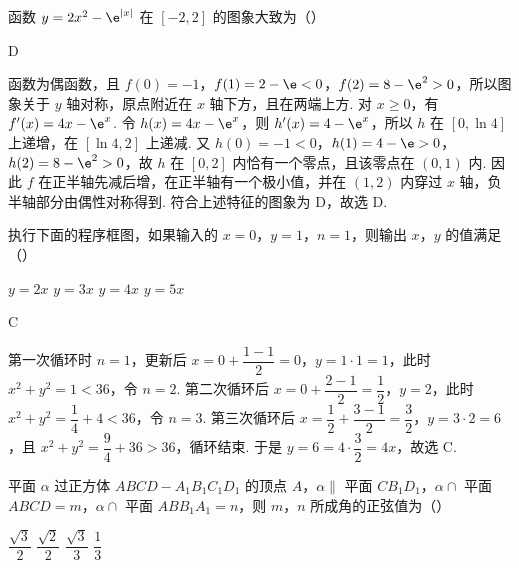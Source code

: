 \begin{problem}
函数 \(y=2x^2-\e^{|x|}\) 在 \([-2,2]\) 的图象大致为（\quad）

    {}
    {}
    {}
\end{problem}

\begin{answer}
D
\end{answer}

\begin{solution}
函数为偶函数，且 \(f(0)=-1\)，\(f(1)=2-\e<0\)，\(f(2)=8-\e^2>0\)，所以图象关于 \(y\) 轴对称，原点附近在 \(x\) 轴下方，且在两端上方. 对 \(x\ge0\)，有 \(f'(x)=4x-\e^x\). 令 \(h(x)=4x-\e^x\)，则 \(h'(x)=4-\e^x\)，所以 \(h\) 在 \([0,\ln4]\) 上递增，在 \([\ln4,2]\) 上递减. 又 \(h(0)=-1<0\)，\(h(1)=4-\e>0\)，\(h(2)=8-\e^2>0\)，故 \(h\) 在 \([0,2]\) 内恰有一个零点，且该零点在 \((0,1)\) 内. 因此 \(f\) 在正半轴先减后增，在正半轴有一个极小值，并在 \((1,2)\) 内穿过 \(x\) 轴，负半轴部分由偶性对称得到. 符合上述特征的图象为 D，故选 D.
\end{solution}

\begin{problem}
执行下面的程序框图，如果输入的 \(x=0\)，\(y=1\)，\(n=1\)，则输出 \(x\)，\(y\) 的值满足（\quad）


\choices
    {\(y=2x\)}
    {\(y=3x\)}
    {\(y=4x\)}
    {\(y=5x\)}
\end{problem}

\begin{answer}
C
\end{answer}

\begin{solution}
第一次循环时 \(n=1\)，更新后 \(x=0+\dfrac{1-1}{2}=0\)，\(y=1\cdot1=1\)，此时 \(x^2+y^2=1<36\)，令 \(n=2\). 第二次循环后 \(x=0+\dfrac{2-1}{2}=\dfrac12\)，\(y=2\)，此时 \(x^2+y^2=\dfrac14+4<36\)，令 \(n=3\). 第三次循环后 \(x=\dfrac12+\dfrac{3-1}{2}=\dfrac32\)，\(y=3\cdot2=6\)，且 \(x^2+y^2=\dfrac94+36>36\)，循环结束. 于是 \(y=6=4\cdot\dfrac32=4x\)，故选 C.
\end{solution}

\begin{problem}
平面 \(\alpha\) 过正方体 \(ABCD-A_1B_1C_1D_1\) 的顶点 \(A\)，\(\alpha\parallel\) 平面 \(CB_1D_1\)，\(\alpha\cap\) 平面 \(ABCD=m\)，\(\alpha\cap\) 平面 \(ABB_1A_1=n\)，则 \(m\)，\(n\) 所成角的正弦值为（\quad）

\choices
    {\(\dfrac{\sqrt3}{2}\)}
    {\(\dfrac{\sqrt2}{2}\)}
    {\(\dfrac{\sqrt3}{3}\)}
    {\(\dfrac13\)}
\end{problem}

